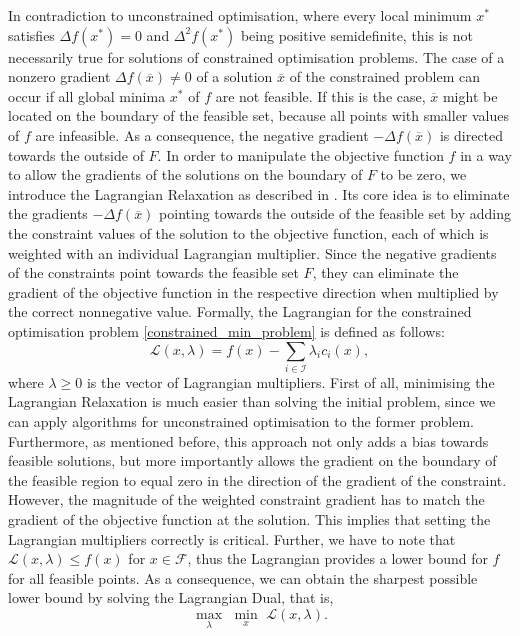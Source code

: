 \indent In contradiction to unconstrained optimisation, where every local minimum $x^*$ satisfies $\Delta f(x^*) = 0$ and $\Delta^2 f(x^*)$ being positive semidefinite, this is not necessarily true for solutions of constrained optimisation problems. The case of a nonzero gradient ${\Delta f(\overline{x}) \neq 0}$ of a solution $\overline{x}$ of the constrained problem can occur if all global minima $x^*$ of $f$ are not feasible. If this is the case, $\overline{x}$ might be located on the boundary of the feasible set, because all points with smaller values of $f$ are infeasible. As a consequence, the negative gradient $-\Delta f(\overline{x})$ is directed towards the outside of $F$. In order to manipulate the objective function $f$ in a way to allow the gradients of the solutions on the boundary of $F$ to be zero, we introduce the Lagrangian Relaxation as described in \cite{NoceWrig06}. Its core idea is to eliminate the gradients $-\Delta f(\overline{x})$ pointing towards the outside of the feasible set by adding the constraint values of the solution to the objective function, each of which is weighted with an individual Lagrangian multiplier. Since the negative gradients of the constraints point towards the feasible set $F$, they can eliminate the gradient of the objective function in the respective direction when multiplied by the correct nonnegative value. Formally, the Lagrangian for the constrained optimisation problem \eqref{constrained_min_problem} is defined as follows:
\[ \mathcal{L}(x, \lambda) = f(x) - \sum_{i \in \mathcal{I}} \lambda_i c_i(x), \]
where $\lambda \geq 0$ is the vector of Lagrangian multipliers. First of all, minimising the Lagrangian Relaxation is much easier than solving the initial problem, since we can apply algorithms for unconstrained optimisation to the former problem. Furthermore, as mentioned before, this approach not only adds a bias towards feasible solutions, but more importantly allows the gradient on the boundary of the feasible region to equal zero in the direction of the gradient of the constraint. However, the magnitude of the weighted constraint gradient has to match the gradient of the objective function at the solution. This implies that setting the Lagrangian multipliers correctly is critical. Further, we have to note that $\mathcal{L}(x, \lambda) \leq f(x)$ for $x \in \mathcal{F}$, thus the Lagrangian provides a lower bound for $f$ for all feasible points. As a consequence, we can obtain the sharpest possible lower bound by solving the Lagrangian Dual, that is, 
\[ \underset{\lambda}{\max}\,\, \underset{x}{\min}\,\, \mathcal{L}(x, \lambda). \]

